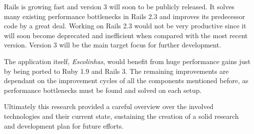 Rails is growing fast and version 3 will soon to be publicly released. It solves many existing performance bottlenecks in Rails 2.3 and improves its predecessor code by a great deal. Working on Rails 2.3 would not be very productive since it will soon become deprecated and inefficient when compared with the most recent version. Version 3 will be the main target focus for further development.

The application itself, \textit{Escolinhas}, would benefit from huge performance gains just by being ported to Ruby 1.9 and Rails 3. The remaining improvements are dependant on the improvement cycles of all the components mentioned before, as performance bottlenecks must be found and solved on each setup.

Ultimately this research provided a careful overview over the involved technologies and their current state, sustaining the creation of a solid research and development plan for future efforts.

